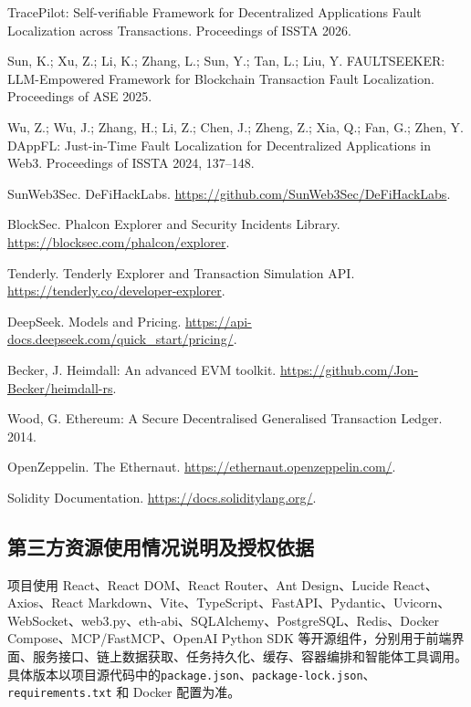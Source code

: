 \documentclass[UTF8,a4paper,12pt]{ctexart}
\begin{document}
\begin{enumerate}[leftmargin=2.8em,label={[\arabic*]}]
  \item TracePilot: Self-verifiable Framework for Decentralized Applications Fault Localization across Transactions. Proceedings of ISSTA 2026.
  \item Sun, K.; Xu, Z.; Li, K.; Zhang, L.; Sun, Y.; Tan, L.; Liu, Y. FAULTSEEKER: LLM-Empowered Framework for Blockchain Transaction Fault Localization. Proceedings of ASE 2025.
  \item Wu, Z.; Wu, J.; Zhang, H.; Li, Z.; Chen, J.; Zheng, Z.; Xia, Q.; Fan, G.; Zhen, Y. DAppFL: Just-in-Time Fault Localization for Decentralized Applications in Web3. Proceedings of ISSTA 2024, 137--148.
  \item SunWeb3Sec. DeFiHackLabs. \url{https://github.com/SunWeb3Sec/DeFiHackLabs}.
  \item BlockSec. Phalcon Explorer and Security Incidents Library. \url{https://blocksec.com/phalcon/explorer}.
  \item Tenderly. Tenderly Explorer and Transaction Simulation API. \url{https://tenderly.co/developer-explorer}.
  \item DeepSeek. Models and Pricing. \url{https://api-docs.deepseek.com/quick_start/pricing/}.
  \item Becker, J. Heimdall: An advanced EVM toolkit. \url{https://github.com/Jon-Becker/heimdall-rs}.
  \item Wood, G. Ethereum: A Secure Decentralised Generalised Transaction Ledger. 2014.
  \item OpenZeppelin. The Ethernaut. \url{https://ethernaut.openzeppelin.com/}.
  \item Solidity Documentation. \url{https://docs.soliditylang.org/}.
\end{enumerate}

\subsection{第三方资源使用情况说明及授权依据}

项目使用 React、React DOM、React Router、Ant Design、Lucide React、Axios、React Markdown、Vite、TypeScript、FastAPI、Pydantic、Uvicorn、WebSocket、web3.py、eth-abi、SQLAlchemy、PostgreSQL、Redis、Docker Compose、MCP/FastMCP、OpenAI Python SDK 等开源组件，分别用于前端界面、服务接口、链上数据获取、任务持久化、缓存、容器编排和智能体工具调用。具体版本以项目源代码中的\texttt{package.json}、\texttt{package-lock.json}、\texttt{requirements.txt} 和 Docker 配置为准。\par
\end{document}
